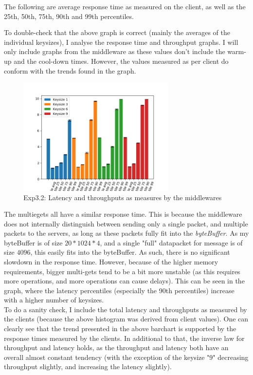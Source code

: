\documentclass[11pt,a4paper]{article}
\begin{document}
The following are average response time as measured on the client, as well as the 25th, 50th, 75th, 90th and 99th percentiles.

To double-check that the above graph is correct (mainly the averages of the individual keysizes), I analyse the response time and throughput graphs.
I will only include graphs from the middleware as these values don't include the warm-up and the cool-down times.
However, the values measured as per client do conform with the trends found in the graph. 

\begin{figure}[H]
\centering
\includegraphics[width=0.7\textwidth]{img/exp5_1/exp5_1_client_percentile_plots_sharded_True.png}
\caption{Exp3.2: Latency and throughputs as measures by the middlewares}
\label{fig:test}
\end{figure}

The multiegets all have a similar response time.
This is because the middleware does not internally distinguish between sending only a single packet, and multiple packets to the servers, as long as these packets fully fit into the \textit{byteBuffer}.
As my byteBuffer is of size $20 * 1024 * 4$, and a single "full" datapacket for message is of size $ 4096 $, this easily fits into the byteBuffer.
As such, there is no significant slowdown in the response time.
However, because of the higher memory requirements, bigger multi-gets tend to be a bit more unstable (as this requires more operations, and more operations can cause delays).
This can be seen in the graph, where the latency percentiles (especially the 90th percentiles) increase with a higher number of keysizes. \\

To do a sanity check, I include the total latency and throughputs as measured by the clients (because the above histogram was derived from client values).
One can clearly see that the trend presented in the above barchart is supported by the response times measured by the clients.
In additional to that, the inverse law for throughput and latency holds, as the throughput and latency both have an overall almost constant tendency (with the exception of the keysize "9" decreasing throughput slightly, and increasing the latency slightly).
\end{document}
